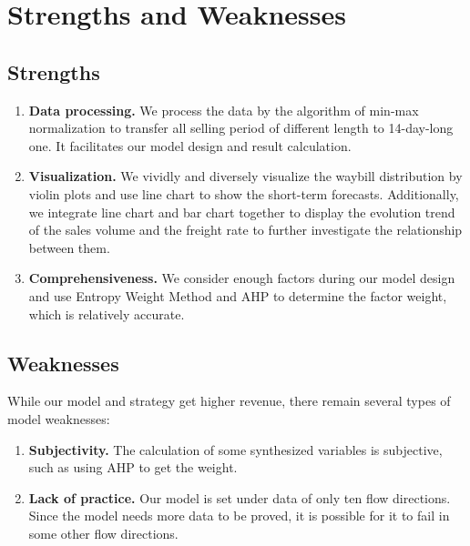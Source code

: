 \section{Strengths and Weaknesses}

\subsection{Strengths}
\begin{enumerate}[\quad\bf1.]        %
    \item \textbf {Data processing.} We process the data by the algorithm of min-max normalization to transfer all selling period of different length to 14-day-long one. It facilitates our model design and result calculation.
    \item \textbf {Visualization.} We vividly and diversely visualize the waybill distribution by violin plots and use line chart to show the short-term forecasts. Additionally, we integrate line chart and bar chart together to display the evolution trend of the sales volume and the freight rate to further investigate the relationship between them.
    \item \textbf {Comprehensiveness.} We consider enough factors during our model design and use Entropy Weight Method and AHP to determine the factor weight, which is relatively accurate.
\end{enumerate}
\subsection{Weaknesses}
While our model and strategy get higher revenue, there remain several types of model weaknesses:
\begin{enumerate}[\quad\bf1.]  %
    \item \textbf {Subjectivity.} The calculation of some synthesized variables is subjective, such as using AHP to get the weight.
    \item \textbf {Lack of practice.} Our model is set under data of only ten flow directions. Since the model needs more data to be proved, it is possible for it to fail in some other flow directions.
\end{enumerate}